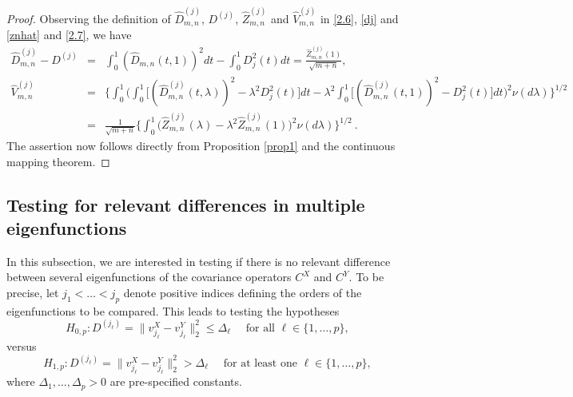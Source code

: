 \documentclass[11pt]{article}
\numberwithin{equation}{section}
\numberwithin{theorem}{section}
\numberwithin{lemma}{section}
\numberwithin{proposition}{section}
\numberwithin{cor}{section}
\numberwithin{definition}{section}
\numberwithin{cons}{section}
\numberwithin{rem}{section}
\numberwithin{exa}{section}
\numberwithin{table}{section}
\numberwithin{figure}{section}
\numberwithin{algo}{section}
\begin{document}
{{\begin{proof}%
Observing the definition of  $\hat D^{(j)}_{m,n}$, $D^{(j)}$, $\hat {Z}^{(j)}_{m,n}$  and  $\hat V^{(j)}_{m,n} $  in   \eqref{2.6},  \eqref{dj} and   \eqref{znhat}
and \eqref{2.7}, we have
\begin{eqnarray*}
  \hat D^{(j)}_{m,n} - D^{(j)}  &=& \int^1_0 (\hat D_{m,n} (t,1))^2 dt - \int^1_0 D^2_j (t) dt  = \frac {\hat{Z}^{(j)}_{m,n}(1)}{\sqrt{m+n}} , \\
    \hat V^{(j)}_{m,n} &=& \Big \{ \int^1_0 \Big ( \int^1_0 \big [  (\hat D^{(j)}_{m,n} (t, \lambda))^{2} - \lambda^{2}   D_j ^2 (t) \big ] dt
 - \lambda^2 \int^1_0 \big [
( \hat D^{(j)}_{m,n} (t,1) )^{2} - D_j^2(t) \big ] dt  \Big )^2 \nu (d \lambda  ) \Big\}^{1/2}  \\
 &=& \frac {1}{\sqrt{m+n}} \Big \{ \int^1_0 \big( \hat  Z^{(j)}_{m,n} (\lambda) - \lambda^2 \hat  Z^{(j)}_{m,n} (1)\big)^2  \nu (d \lambda)  \Big \}^{1/2} ~.
\end{eqnarray*}
The assertion now follows directly from Proposition \ref{prop1} and the continuous mapping theorem.
\end{proof}

\subsection{Testing for relevant differences in multiple eigenfunctions}\label{sec-mult}
\label{sec3}
\def\theequation{3.\arabic{equation}}
\setcounter{equation}{0}

In this subsection, we are interested in testing if there is no relevant difference between several  eigenfunctions of the covariance operators $C^X$ and $C^Y$.
To be precise, let  $j_1 < \ldots < j_p$ denote positive indices defining the orders of the eigenfunctions   to be compared. This leads to testing the hypotheses
\begin{equation}\label{1.3}
H_{0,p}\colon
D^{(j_{\ell})}=
 \| v^X_{j_\ell} - v^Y_{j_\ell} \|^2_2 \leq \Delta_\ell   \quad \mbox{ for all }  \ell  \in \{  1, \ldots, p \} ,
\end{equation}
versus
\begin{equation}\label{1.3a}
H_{1,p}\colon
D^{(j_{\ell})}=
 \| v^X_{j_\ell} - v^Y_{j_\ell} \|^2_2  > \Delta_\ell  \quad \mbox{ for at least one }  \ell  \in \{  1, \ldots, p \} ,
\end{equation}
where $\Delta_1, \ldots, \Delta_p > 0$ are pre-specified constants.

}}
\end{document}
